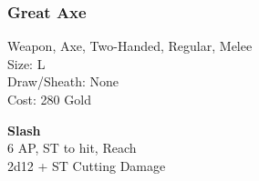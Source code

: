 \subsubsection{Great Axe}\label{weapon:greatAxe}
Weapon, Axe, Two-Handed, Regular, Melee\\
Size: L\\
Draw/Sheath: None\\
Cost: 280 Gold

\textbf{Slash}\\
6 AP, ST to hit,  Reach\\
2d12 + ST Cutting Damage
